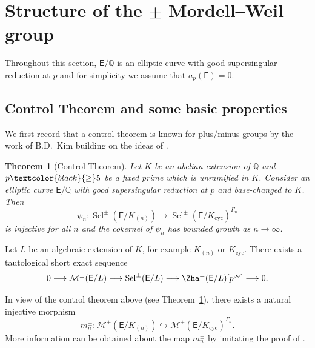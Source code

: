 \documentclass{amsart}
\newcommand{\edit}[1]{\textcolor{black}{#1}}
\newtheorem{theorem}{Theorem}[section]
\numberwithin{equation}{section}
\theoremstyle{remark}
\newcommand{\EC}{\mathsf{E}}
\newcommand{\cM}{\mathcal{M}}
\newcommand{\Q}{\mathbb{Q}}
\newcommand{\cyc}{\operatorname{{cyc}}}
\newcommand{\Sel}{\operatorname{Sel}}
\theoremstyle{plain} %
\begin{document}
\section{Structure of the \texorpdfstring{$\pm$}{} Mordell--Weil group}
\label{sec: pm MW group}

Throughout this section, $\EC/\Q$ is an elliptic curve with good supersingular reduction at $p$ and for simplicity we assume that $a_p(\EC) =0$.

\subsection{Control Theorem and \edit{s}ome basic properties}
We first record that a control theorem is known for plus/minus groups by the work of B.D.~Kim \cite[\edit{Lemma~3.9}]{BDKim13} building on the ideas of \cite{Gre03}.

\begin{theorem}[Control Theorem]
\label{Control Theorem ss}
Let $K$ be an abelian extension of $\Q$ and $p\edit{\geq}5$ be a fixed prime which is unramified in $K$.
Consider an elliptic curve $\EC/\Q$ with good supersingular reduction at $p$ and base-changed to $K$.
Then
\[
\psi_n: \Sel^{\pm}(\EC/K_{(n)}) \longrightarrow \Sel^{\pm}(\EC/K_{\cyc})^{\Gamma_n}
\]
is injective for all $n$ and the cokernel of $\psi_n$ has bounded growth as $n \to \infty$.
\end{theorem}

Let $L$ be an algebraic extension of $K$, for example $K_{(n)}$ or $K_{\cyc}$.
There exists a tautological short exact sequence
\begin{equation}
\label{eqn: tautological ss}
0 \longrightarrow \cM^{\pm}(\EC/L) \longrightarrow \Sel^{\pm}(\EC/L) \longrightarrow \Zha^{\pm}(\EC/L)[p^\infty] \longrightarrow 0.
\end{equation}

In view of the control theorem above (see Theorem~\ref{Control Theorem ss}), there exists a natural injective morphism
\[
m^{\pm}_n: \cM^{\pm}(\EC/K_{(n)}) \hookrightarrow \cM^{\pm}(\EC/K_{\cyc})^{\Gamma_n}.
\]
More information can be obtained about the map $m_n^{\pm}$ by imitating the proof of \cite[Theorem~5.5]{Lei23}.
\end{document}
